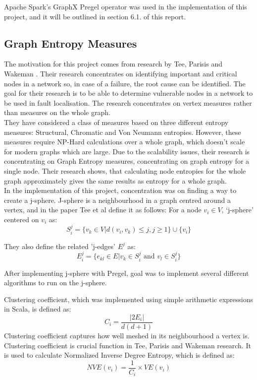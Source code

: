 \documentclass{article}
\theoremstyle{definition}
\begin{document}
Apache Spark's GraphX Pregel operator was used in the implementation of this project, and it will be outlined in section 6.1. of this report. \\

\subsection{Graph Entropy Measures}
The motivation for this project comes from research by Tee, Parisis and Wakeman \cite{Tee2016b}. Their research concentrates on identifying important and critical nodes in a network so, in case of a failure, the root cause can be identified. The goal for their research is to be able to determine vulnerable nodes in a network to be used in fault localisation. The research concentrates on vertex measures rather than measures on the whole graph. \\

They have considered a class of measures based on three different entropy measures: Structural, Chromatic and Von Neumann entropies. However, these measures require NP-Hard calculations over a whole graph, which doesn't scale for modern graphs which are large. Due to the scalability issues, their research is concentrating on Graph Entropy measures, concentrating on graph entropy for a single node. Their research shows, that calculating node entropies for the whole graph approximately gives the same results as entropy for a whole graph.  \\

In the implementation of this project, concentration was on finding a way to create a j-sphere. J-sphere is a neighbourhood in a graph centred around a vertex, and in the paper Tee et al define it as follows: 
For a node $v_{i} \in V$, `j-sphere'
  centered on $v_{i}$ as:
\begin{equation}\label{eqn:jsphere}
S^{j}_{i}= \{ v_{k} \in V | d(v_{i},v_{k}) \leq j, j \geq 1 \} \cup \{ v_{i} \}
\end{equation}

They also define the related 'j-edges' $E^{j}$ as:
\begin{equation}
  E^{j}_{i}=\{ e_{kl} \in E | v_{k} \in S^{j}_{i} \mbox{ and  } v_{l} \in S^{j}_{i} \}
\end{equation}

After implementing j-sphere with Pregel, goal was to implement several different algorithms to run on the j-sphere. 

Clustering coefficient, which was implemented using simple arithmetic expressions in Scala, is defined as: 
\begin{equation}
C_{i} = \frac{|2E_{i}|}{d(d+1)}
\end{equation}
Clustering coefficient captures how well meshed in its neighbourhood a vertex is. Clustering coefficient is crucial function in Tee, Parisis and Wakeman research. It is used to calculate Normalized Inverse Degree Entropy, which is defined as:
\begin{equation}
NVE(v_{i}) = \frac{1}{C_{i}} \times VE(v_{i})
\end{equation} 
\end{document}
